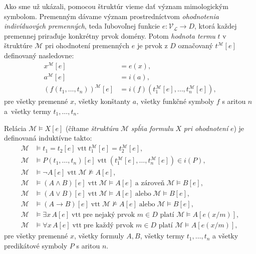 Ako sme už ukázali, pomocou štruktúr vieme dať význam mimologickým symbolom. Premenným dávame význam prostredníctvom
\textit{ohodnotenia indivíduových premenných}, teda ľubovoľnej funkcie $e: \mathcal{V}_\mathcal{L} \rightarrow D$, ktorá každej premennej priraďuje konkrétny prvok domény. Potom \textit{hodnota termu} $t$ v štruktúre $\mathcal{M}$ pri ohodnotení premenných $e$ je prvok z $D$ označovaný $t^\mathcal{M}[e]$ definovaný nasledovne:
\[
    \begin{aligned}
        x^{\mathcal{M}}[e]                                & = e(x), \\
        a^{\mathcal{M}}[e]                                & = i(a), \\
        \left(f(t_1, \ldots, t_n)\right)^{\mathcal{M}}[e] & =
        i(f)\left(t_1^{\mathcal{M}}[e], \ldots, t_n^{\mathcal{M}}[e]\right),
    \end{aligned}
\]
pre všetky premenné $x$, všetky konštanty $a$, všetky funkčné symboly $f$ s aritou $n$ a~všetky termy $t_1, \dots, t_n$.

Relácia $\mathcal{M} \models X[e]$ (čítame \textit{štruktúra }$\mathcal{M}$ \textit{spĺňa formulu} $X$ \textit{pri ohodnotení} $e$) je definovaná induktívne takto:
\[
    \begin{aligned}
        \mathcal{M} & \models t_1 = t_2 [e] \;\text{vtt}\; t_1^{\mathcal{M}}[e] = t_2^{\mathcal{M}}[e],                                      \\
        \mathcal{M} & \models P(t_1, \ldots, t_n)[e] \;\text{vtt}\; (t_1^{\mathcal{M}}[e], \ldots, t_n^{\mathcal{M}}[e]) \in i(P),           \\
        \mathcal{M} & \models \neg A [e] \;\text{vtt}\; \mathcal{M} \not\models A [e],                                                       \\
        \mathcal{M} & \models (A \land B)[e] \;\text{vtt}\; \mathcal{M} \models A[e] \;\text{a zároveň}\; \mathcal{M} \models B[e],          \\
        \mathcal{M} & \models (A \lor B)[e] \;\text{vtt}\; \mathcal{M} \models A[e] \;\text{alebo}\; \mathcal{M} \models B[e],               \\
        \mathcal{M} & \models (A \to B)[e] \;\text{vtt}\; \mathcal{M} \not\models A[e] \;\text{alebo}\; \mathcal{M} \models B[e],            \\
        \mathcal{M} & \models \exists x\, A[e] \;\text{vtt}\; \text{pre nejaký prvok } m \in D \text{ platí } \mathcal{M} \models A[e(x/m)], \\
        \mathcal{M} & \models \forall x\, A[e] \;\text{vtt}\; \text{pre každý prvok } m \in D \text{ platí } \mathcal{M} \models A[e(x/m)],
    \end{aligned}
\]
pre všetky premenné $x$, všetky formuly $A, B$, všetky termy $t_1, \dots, t_n$ a všetky predikátové symboly $P$ s aritou $n$.

